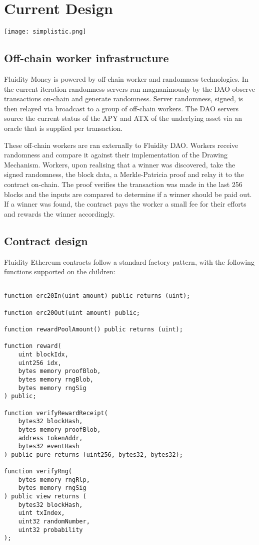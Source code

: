 
\section{Current Design}
\begin{center}
\texttt{[image: simplistic.png]}
\end{center}
\subsection{Off-chain worker infrastructure}

Fluidity Money is powered by off-chain worker and randomness technologies. In the current iteration randomness servers ran magnanimously by the DAO observe transactions on-chain and generate randomness. Server randomness, signed, is then relayed via broadcast to a group of off-chain workers. The DAO servers source the current status of the APY and ATX of the underlying asset via an oracle that is supplied per transaction.

These off-chain workers are ran externally to Fluidity DAO. Workers receive randomness and compare it against their implementation of the Drawing Mechanism. Workers, upon realising that a winner was discovered, take the signed randomness, the block data, a Merkle-Patricia proof and relay it to the contract on-chain. The proof verifies the transaction was made in the last 256 blocks and the inputs are compared to determine if a winner should be paid out. If a winner was found, the contract pays the worker a small fee for their efforts and rewards the winner accordingly.

\subsection{Contract design}

Fluidity Ethereum contracts follow a standard factory pattern, with the following functions supported on the children:

\begin{lstlisting}

function erc20In(uint amount) public returns (uint);

function erc20Out(uint amount) public;

function rewardPoolAmount() public returns (uint);

function reward(
    uint blockIdx,
    uint256 idx,
    bytes memory proofBlob,
    bytes memory rngBlob,
    bytes memory rngSig
) public;

function verifyRewardReceipt(
    bytes32 blockHash,
    bytes memory proofBlob,
    address tokenAddr,
    bytes32 eventHash
) public pure returns (uint256, bytes32, bytes32);

function verifyRng(
    bytes memory rngRlp,
    bytes memory rngSig
) public view returns (
    bytes32 blockHash,
    uint txIndex,
    uint32 randomNumber,
    uint32 probability
);

\end{lstlisting}